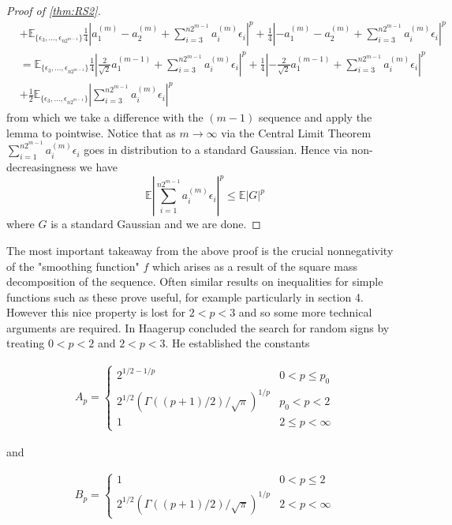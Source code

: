 \documentclass[10pt]{article}
\newcommand{\E}{\mathbb{E}}
\newcommand{\1}{\textbf{1}}
\newcommand{\normOne}[1]{\left\lvert#1\right\rvert}
\theoremstyle{remark}
\theoremstyle{definition}
\begin{document}
\begin{proof}[Proof of \ref{thm:RS2}]
\begin{align*}
		&+\E_{\{\epsilon_3,...,\epsilon_{n2^{m-1}}\}}\frac{1}{4}\normOne{a_1^{(m)}-a_2^{(m)}+\sum_{i=3}^{n2^{m-1}}a_i^{(m)}\epsilon_i}^p+\frac{1}{4}\normOne{-a_1^{(m)}-a_2^{(m)}+\sum_{i=3}^{n2^{m-1}}a_i^{(m)}\epsilon_i}^p \\
		&= \E_{\{\epsilon_3,...,\epsilon_{n2^{m-1}}\}}\frac{1}{4}\normOne{\frac{2}{\sqrt{2}}a_1^{(m-1)}+\sum_{i=3}^{n2^{m-1}}a_i^{(m)}\epsilon_i}^p+\frac{1}{4}\normOne{-\frac{2}{\sqrt{2}}a_1^{(m-1)}+\sum_{i=3}^{n2^{m-1}}a_i^{(m)}\epsilon_i}^p \\
		&+ \frac{1}{2}\E_{\{\epsilon_3,...,\epsilon_{n2^{m-1}}\}}\normOne{\sum_{i=3}^{n2^{m-1}}a_i^{(m)}\epsilon_i}^p
	\end{align*} from which we take a difference with the $(m-1)$ sequence and apply the lemma to pointwise. Notice that as $m \to \infty$ via the Central Limit Theorem $\sum_{i=1}^{n2^{m-1}}a_i^{(m)}\epsilon_i$ goes in distribution to a standard Gaussian. Hence via non-decreasingness we have 
	\begin{equation*}
		\E\normOne{\sum_{i=1}^{n2^{m-1}}a_i^{(m)}\epsilon_i}^p \leq \E\normOne{G}^p 
	\end{equation*} where $G$ is a standard Gaussian and we are done.
\end{proof} 

The most important takeaway from the above proof is the crucial nonnegativity of the "smoothing function" $f$ which arises as a result of the square mass decomposition of the sequence. Often similar results on inequalities for simple functions such as these prove useful, for example particularly in section 4. However this nice property is lost for $2 < p < 3$ and so some more technical arguments are required. In \cite{H} Haagerup concluded the search for random signs by treating $0 < p < 2$ and $2 < p < 3$. He established the constants


\begin{align*}
	A_p = 
	\begin{cases}
		2^{1/2-1/p} & 0 < p \leq p_0 \\
		2^{1/2}(\Gamma((p+1)/2)/\sqrt{\pi})^{1/p} & p_0 < p < 2\\
		1 & 2 \leq p < \infty
	\end{cases}
\end{align*}

and 

\begin{align*}
	B_p = 
	\begin{cases}
		1 & 0 < p \leq 2\\
		2^{1/2}(\Gamma((p+1)/2)/\sqrt{\pi})^{1/p} & 2 < p < \infty
	\end{cases}
\end{align*}
\end{document}
